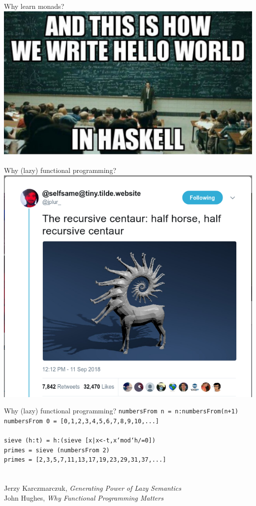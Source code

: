 \documentclass{beamer}
\begin{document}
\begin{frame}{Why learn monads?}
  \includegraphics[width=\textwidth]{hello-haskell.jpg}
\end{frame}

\begin{frame}{Why (lazy) functional programming?}
  \includegraphics[width=\textwidth]{recursive-centaur.png}
\end{frame}

\begin{frame}{Why (lazy) functional programming?}
  \texttt{numbersFrom n = n:numbersFrom(n+1)}\\ \pause
  \texttt{numbersFrom 0 = [0,1,2,3,4,5,6,7,8,9,10,...]}\\ \pause
  \ \\
  \texttt{sieve (h:t) = h:(sieve [x|x<-t,x`mod`h/=0])} \\ \pause
  \texttt{primes = sieve (numbersFrom 2)} \\ \pause
  \texttt{primes = [2,3,5,7,11,13,17,19,23,29,31,37,...]} \\ \pause
  \ \\ \
  \\ Jerzy Karczmarczuk, \textit{Generating Power of Lazy Semantics} \\ \pause  John Hughes, \textit{Why Functional Programming Matters}
\end{frame}
\end{document}
